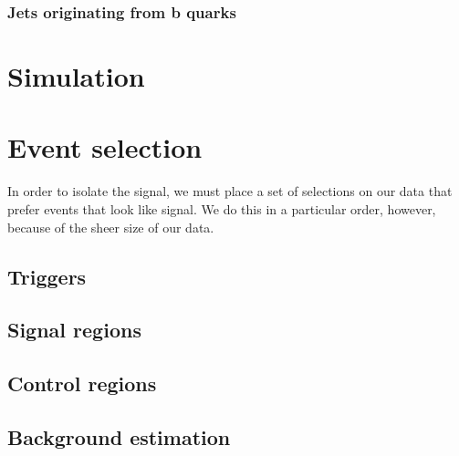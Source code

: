 \subsubsection{Jets originating from b quarks}

\section{Simulation}

\section{Event selection}
In order to isolate the signal, we must place a set of selections on our data that prefer events that look like signal. 
We do this in a particular order, however, because of the sheer size of our data. 
\subsection{Triggers}
\subsection{Signal regions}
\subsection{Control regions}
\subsection{Background estimation}

